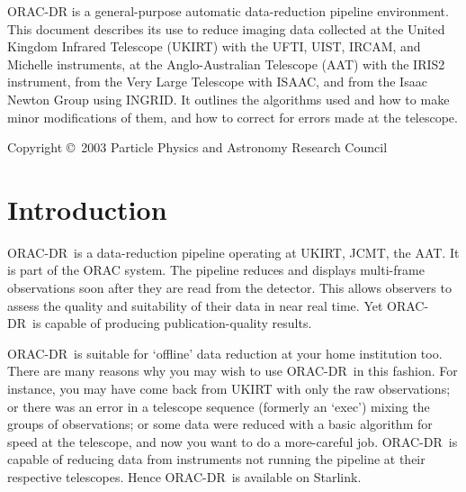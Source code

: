 \documentclass[twoside,11pt]{article}
\newcommand{\stardocinitials}  {SUN}
\newcommand{\stardocnumber}    {232.7}
\newcommand{\stardoccopyright} {Copyright \copyright\ 2003 Particle Physics and Astronomy Research Council}
\newcommand{\stardocabstract}  {{\footnotesize ORAC-DR} is a
general-purpose automatic data-reduction pipeline environment.  This
document describes its use to reduce imaging data collected at the
United Kingdom Infrared Telescope (UKIRT) with the UFTI, UIST, IRCAM,
and Michelle instruments, at the Anglo-Australian Telescope (AAT) with
the IRIS2 instrument, from the Very Large Telescope with ISAAC, and
from the Isaac Newton Group using INGRID.  It outlines the algorithms
used and how to make minor modifications of them, and how to correct
for errors made at the telescope.}
\newcommand{\stardocname}{\stardocinitials /\stardocnumber}
\newcommand{\htmladdnormallink}[2]{#1}
\newenvironment{latexonly}{}{}
\newcommand{\xlabel}[1]{}
\renewcommand{\_}{\texttt{\symbol{95}}}
\newcommand{\ORACDR}{{\footnotesize ORAC-DR}}
\newcommand{\AAT}{\htmladdnormallink{AAT}{http://www.aao.gov.au/}}
\newcommand{\JCMT}{\htmladdnormallink{JCMT}{http://www.jach.hawaii.edu/JACpublic/JCMT/}}
\newcommand{\UKIRT}{\htmladdnormallink{UKIRT}{http://www.jach.hawaii.edu/JACpublic/UKIRT/}}
\renewcommand{\thepage}{\roman{page}}
\begin{document}
\stardocabstract

\begin{latexonly}
\newpage
\vspace*{\fill}
\stardoccopyright
\end{latexonly}

  \newpage
  \begin{latexonly}
    \setlength{\parskip}{0mm}
    \tableofcontents
    \setlength{\parskip}{\medskipamount}
    \markboth{\stardocname}{\stardocname}
  \end{latexonly}
\cleardoublepage
\renewcommand{\thepage}{\arabic{page}}
\setcounter{page}{1}

\section{\xlabel{introduction}Introduction\label{introduction}}

\ORACDR\ is a data-reduction pipeline operating at \UKIRT, \JCMT,
the \AAT.  It is part of the
\htmladdnormallink{ORAC system}{http://www.stsci.edu/stsci/meetings/adassVII/bridgera.html}.
The pipeline reduces and displays multi-frame
observations soon after they are read from the detector.  This allows
observers to assess the quality and suitability of their data in near
real time.  Yet \ORACDR\ is capable of producing publication-quality
results.  

\ORACDR\ is suitable for `offline' data reduction at your home
institution too.  There are many reasons why you may wish to use
\ORACDR\ in this fashion.  For instance, you may have come back from
UKIRT with only the raw observations; or there was an error in a
telescope sequence (formerly an `exec') mixing the groups of
observations; or some data were reduced with a basic algorithm for
speed at the telescope, and now you want to do a more-careful job.
\ORACDR\ is capable of reducing data from instruments not running the
pipeline at their respective telescopes.  Hence \ORACDR\ is available
on Starlink.
\end{document}
